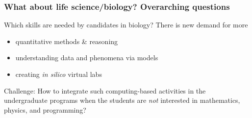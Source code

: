\documentclass{beamer}
\begin{document}
\begin{frame}
\frametitle{What about life science/biology? Overarching questions}

\pause
\begin{block}{Which skills are needed by candidates in biology? }
There is new demand for more

\begin{itemize}
  \item quantitative methods {\&} reasoning

  \item understanding data and phenomena via models

  \item creating \emph{in silico} virtual labs
\end{itemize}

\noindent
\end{block}

\pause
\begin{block}{Challenge: }
How to integrate such computing-based activities in the undergraduate programs
when the students are \emph{not} interested in mathematics, physics, and
programming?
\end{block}
\end{frame}
\end{document}
